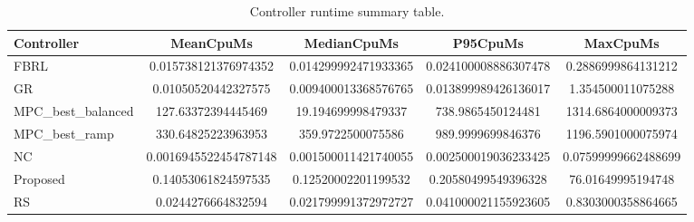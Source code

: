 \begin{table}[t]
\centering
\caption{Controller runtime summary table.}
\label{tab:runtime_auto}
\begin{tabular}{lcccc}
\toprule
Controller & MeanCpuMs & MedianCpuMs & P95CpuMs & MaxCpuMs \\
\midrule
FBRL & 0.015738121376974352 & 0.014299992471933365 & 0.024100008886307478 & 0.2886999864131212 \\
GR & 0.01050520442327575 & 0.009400013368576765 & 0.013899989426136017 & 1.354500011075288 \\
MPC\_best\_balanced & 127.63372394445469 & 19.194699998479337 & 738.9865450124481 & 1314.6864000009373 \\
MPC\_best\_ramp & 330.64825223963953 & 359.9722500075586 & 989.9999699846376 & 1196.5901000075974 \\
NC & 0.0016945522454787148 & 0.001500011421740055 & 0.002500019036233425 & 0.07599999662488699 \\
Proposed & 0.14053061824597535 & 0.12520002201199532 & 0.20580499549396328 & 76.01649995194748 \\
RS & 0.0244276664832594 & 0.021799991372972727 & 0.041000021155923605 & 0.8303000358864665 \\
\bottomrule
\end{tabular}
\end{table}
